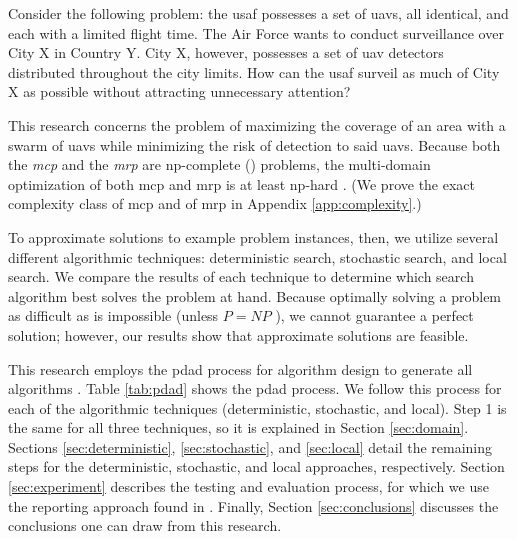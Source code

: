 \documentclass[../main.tex]{subfiles}
\begin{document}
Consider the following problem: the \ac{usaf} possesses a set of \acp{uav}, all identical, and each with a limited flight time. The Air Force wants to conduct surveillance over City X in Country Y. City X, however, possesses a set of \ac{uav} detectors distributed throughout the city limits. How can the \ac{usaf} surveil as much of City X as possible without attracting unnecessary attention?

This research concerns the problem of maximizing the coverage of an area with a swarm of \acp{uav} while minimizing the risk of detection to said \acp{uav}. Because both the \textit{\ac{mcp}} and the \textit{\ac{mrp}} are \ac{np}-complete () problems, the multi-domain optimization of both \ac{mcp} and \ac{mrp} is at least \ac{np}-hard \cite{Garey1979, Cobham1965, wikipedia:max-coverage}. (We prove the exact complexity class of \ac{mcp} and of \ac{mrp} in Appendix \ref{app:complexity}.)

To approximate solutions to example problem instances, then, we utilize several different algorithmic techniques: deterministic search, stochastic search, and local search. We compare the results of each technique to determine which search algorithm best solves the problem at hand. Because optimally solving a problem as difficult as \probs is impossible (unless $P=NP$ \cite{Cook1971}), we cannot guarantee a perfect solution; however, our results show that approximate solutions are feasible.

This research employs the \ac{pdad} process for algorithm design to generate all algorithms \cite{handout:lecture2, wikipedia:problem-domain, Young2018}. Table \ref{tab:pdad} shows the \ac{pdad} process. We follow this process for each of the algorithmic techniques (deterministic, stochastic, and local). Step 1 is the same for all three techniques, so it is explained in Section \ref{sec:domain}. Sections \ref{sec:deterministic}, \ref{sec:stochastic}, and \ref{sec:local} detail the remaining steps for the deterministic, stochastic, and local approaches, respectively. Section \ref{sec:experiment} describes the testing and evaluation process, for which we use the reporting approach found in \cite{Barr1995}. Finally, Section \ref{sec:conclusions} discusses the conclusions one can draw from this research.
\end{document}
